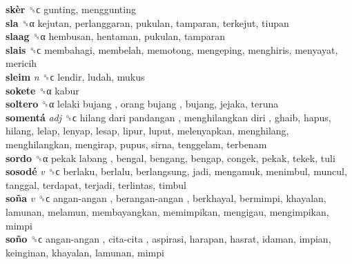 \textbf{skèr} ␝ϲ  gunting, menggunting  \\
\textbf{sla} ␝α  kejutan, perlanggaran, pukulan, tamparan, terkejut, tiupan  \\
\textbf{slaag} ␝α  hembusan, hentaman, pukulan, tamparan  \\
\textbf{slais} ␝ϲ  membahagi, membelah, memotong, mengeping, menghiris, menyayat, mericih  \\
\textbf{sleim} \emph{n}  ␝ϲ  lendir, ludah, mukus  \\
\textbf{sokete} ␝α  kabur  \\
\textbf{soltero} ␝α   lelaki bujang ,  orang bujang , bujang, jejaka, teruna  \\
\textbf{somentá} \emph{adj}  ␝ϲ   hilang dari pandangan ,  menghilangkan diri , ghaib, hapus, hilang, lelap, lenyap, lesap, lipur, luput, melenyapkan, menghilang, menghilangkan, mengirap, pupus, sirna, tenggelam, terbenam  \\
\textbf{sordo} ␝α   pekak labang , bengal, bengang, bengap, congek, pekak, tekek, tuli  \\
\textbf{sosodé} \emph{v}  ␝ϲ  berlaku, berlalu, berlangsung, jadi, mengamuk, menimbul, muncul, tanggal, terdapat, terjadi, terlintas, timbul  \\
\textbf{soña} \emph{v}  ␝ϲ   angan-angan ,  berangan-angan , berkhayal, bermimpi, khayalan, lamunan, melamun, membayangkan, memimpikan, mengigau, mengimpikan, mimpi  \\
\textbf{soño} ␝ϲ   angan-angan ,  cita-cita , aspirasi, harapan, hasrat, idaman, impian, keinginan, khayalan, lamunan, mimpi  \\
